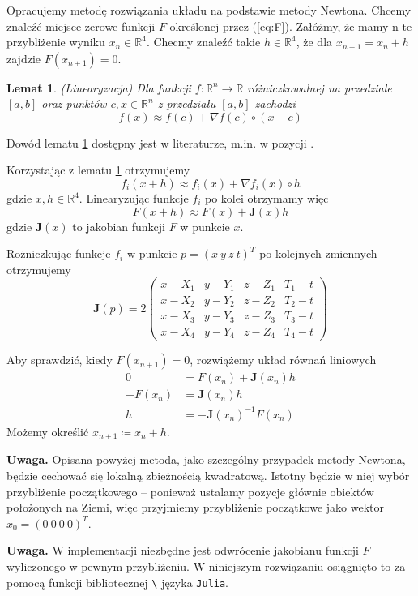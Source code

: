 \documentclass{article}
\newtheorem{lemma}{Lemat}
\begin{document}
Opracujemy metodę rozwiązania układu na podstawie metody Newtona. Chcemy znaleźć miejsce zerowe funkcji
$F$ określonej przez (\ref{eq:F}). Załóżmy, że mamy n-te przybliżenie wyniku $x_n \in \mathbb{R}^4$.
Checmy znaleźć takie $h \in \mathbb{R}^4$, że dla $x_{n+1} = x_n + h$ zajdzie $F(x_{n+1}) = 0$.

\begin{lemma}(Linearyzacja) \label{th:linearize}
    Dla funkcji $f: \mathbb{R}^n \rightarrow \mathbb{R}$ różniczkowalnej na przedziale $[a, b]$
    oraz punktów $c, x \in \mathbb{R}^n$ z przedziału $[a, b]$ zachodzi
    \[
        f(x) \approx f(c) + \nabla f(c) \circ (x - c)
    \]
\end{lemma}
Dowód lematu \ref{th:linearize} dostępny jest w literaturze, m.in. w pozycji \cite{linearize}.

Korzystając z lematu \ref{th:linearize} otrzymujemy
\[
f_i(x+h) \approx f_i(x) + \nabla f_i(x) \circ h
\]
gdzie $x, h \in \mathbb{R}^4$.
Linearyzując funkcje $f_i$ po kolei otrzymamy więc
\[
F(x+h) \approx F(x) + \mathbf{J}(x)h
\]
gdzie $\mathbf{J}(x)$ to jakobian funkcji $F$ w punkcie $x$.

Rożniczkując funkcje $f_i$ w punkcie $p=(x \ y \ z \ t)^T$ po kolejnych zmiennych otrzymujemy
\[
\label{eq:jacobian}
\mathbf{J}(p) = 2
\begin{pmatrix}
    x-X_1  & y-Y_1 & z-Z_1 & T_1-t \\
    x-X_2  & y-Y_2 & z-Z_2 & T_2-t \\
    x-X_3  & y-Y_3 & z-Z_3 & T_3-t \\
    x-X_4  & y-Y_4 & z-Z_4 & T_4-t
\end{pmatrix}
\]

Aby sprawdzić, kiedy $F(x_{n+1}) = 0$, rozwiążemy układ równań liniowych
\begin{align*}
    0 &= F(x_n) + \mathbf{J}(x_n)h \\
    -F(x_n) &= \mathbf{J}(x_n)h \\
    h &= -\mathbf{J}(x_n)^{-1}F(x_n)
\end{align*}
Możemy określić $x_{n+1} \coloneqq x_n + h$.

\textbf{Uwaga.} \enspace Opisana powyżej metoda, jako szczególny przypadek metody Newtona, będzie cechować
się lokalną zbieżnością kwadratową. Istotny będzie w niej wybór przybliżenie początkowego -- ponieważ ustalamy
pozycje głównie obiektów położonych na Ziemi, więc przyjmiemy przybliżenie początkowe jako wektor $x_0 = (0 \ 0 \ 0 \ 0)^T$.

\textbf{Uwaga.} \enspace W implementacji niezbędne jest odwrócenie jakobianu funkcji $F$ wyliczonego w
pewnym przybliżeniu. W niniejszym rozwiązaniu osiągnięto to za pomocą funkcji bibliotecznej \texttt{\textbackslash}
języka \texttt{Julia}.
\end{document}
